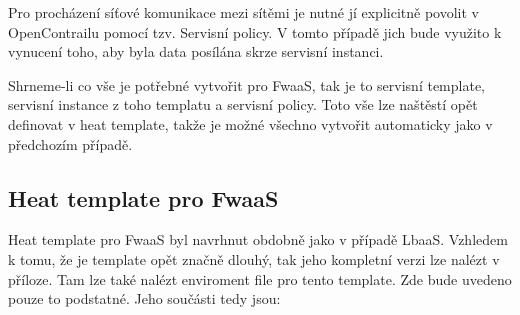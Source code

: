 Pro procházení síťové komunikace mezi sítěmi je nutné jí explicitně povolit v OpenContrailu pomocí tzv. Servisní policy. V tomto případě jich bude využito k vynucení toho, aby byla data posílána skrze servisní instanci.

Shrneme-li co vše je potřebné vytvořit pro FwaaS, tak je to servisní template, servisní instance z toho templatu a servisní policy. Toto vše lze naštěstí opět definovat v heat template, takže je možné všechno vytvořit automaticky jako v předchozím případě.

\subsection{Heat template pro FwaaS}

Heat template pro FwaaS byl navrhnut obdobně jako v případě LbaaS. Vzhledem k tomu, že je template opět značně dlouhý, tak jeho kompletní verzi lze nalézt v příloze. Tam lze také nalézt enviroment file pro tento template. Zde bude uvedeno pouze to podstatné. Jeho součásti tedy jsou: 

